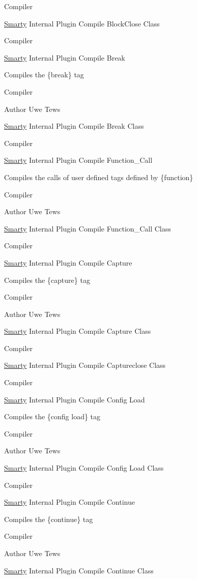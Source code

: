 Compiler

\hyperlink{class_smarty}{Smarty} Internal Plugin Compile Block\+Close Class

Compiler

\hyperlink{class_smarty}{Smarty} Internal Plugin Compile Break

Compiles the \{break\} tag

Compiler \begin{DoxyAuthor}{Author}
Uwe Tews
\end{DoxyAuthor}
\hyperlink{class_smarty}{Smarty} Internal Plugin Compile Break Class

Compiler

\hyperlink{class_smarty}{Smarty} Internal Plugin Compile Function\+\_\+\+Call

Compiles the calls of user defined tags defined by \{function\}

Compiler \begin{DoxyAuthor}{Author}
Uwe Tews
\end{DoxyAuthor}
\hyperlink{class_smarty}{Smarty} Internal Plugin Compile Function\+\_\+\+Call Class

Compiler

\hyperlink{class_smarty}{Smarty} Internal Plugin Compile Capture

Compiles the \{capture\} tag

Compiler \begin{DoxyAuthor}{Author}
Uwe Tews
\end{DoxyAuthor}
\hyperlink{class_smarty}{Smarty} Internal Plugin Compile Capture Class

Compiler

\hyperlink{class_smarty}{Smarty} Internal Plugin Compile Captureclose Class

Compiler

\hyperlink{class_smarty}{Smarty} Internal Plugin Compile Config Load

Compiles the \{config load\} tag

Compiler \begin{DoxyAuthor}{Author}
Uwe Tews
\end{DoxyAuthor}
\hyperlink{class_smarty}{Smarty} Internal Plugin Compile Config Load Class

Compiler

\hyperlink{class_smarty}{Smarty} Internal Plugin Compile Continue

Compiles the \{continue\} tag

Compiler \begin{DoxyAuthor}{Author}
Uwe Tews
\end{DoxyAuthor}
\hyperlink{class_smarty}{Smarty} Internal Plugin Compile Continue Class

